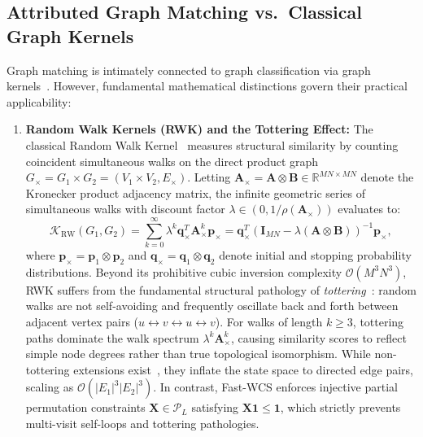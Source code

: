\documentclass[a4paper,fleqn]{cas-dc}
\theoremstyle{thmstyleone}
\theoremstyle{thmstyletwo}
\theoremstyle{thmstylethree}
\begin{document}
\subsection{Attributed Graph Matching vs.\ Classical Graph Kernels}
Graph matching is intimately connected to graph classification via graph kernels~\cite{vishwanathan2010}. However, fundamental mathematical distinctions govern their practical applicability:
\begin{enumerate}
    \item \textbf{Random Walk Kernels (RWK) and the Tottering Effect:} The classical Random Walk Kernel~\cite{vishwanathan2010, kashima2003marginalized} measures structural similarity by counting coincident simultaneous walks on the direct product graph $G_\times = G_1 \times G_2 = (V_1 \times V_2, E_\times)$. Letting $\mathbf{A}_\times = \mathbf{A} \otimes \mathbf{B} \in \mathbb{R}^{MN \times MN}$ denote the Kronecker product adjacency matrix, the infinite geometric series of simultaneous walks with discount factor $\lambda \in (0, 1 / \rho(\mathbf{A}_\times))$ evaluates to:
    \begin{equation}
    \mathcal{K}_{\text{RW}}(G_1, G_2) = \sum_{k=0}^\infty \lambda^k \mathbf{q}_\times^T \mathbf{A}_\times^k \mathbf{p}_\times = \mathbf{q}_\times^T \left( \mathbf{I}_{MN} - \lambda (\mathbf{A} \otimes \mathbf{B}) \right)^{-1} \mathbf{p}_\times,
    \label{eq:rwk_sylvester}
    \end{equation}
    where $\mathbf{p}_\times = \mathbf{p}_1 \otimes \mathbf{p}_2$ and $\mathbf{q}_\times = \mathbf{q}_1 \otimes \mathbf{q}_2$ denote initial and stopping probability distributions. Beyond its prohibitive cubic inversion complexity $\mathcal{O}(M^3 N^3)$, RWK suffers from the fundamental structural pathology of \emph{tottering}~\cite{mahe2005graph}: random walks are not self-avoiding and frequently oscillate back and forth between adjacent vertex pairs ($u \leftrightarrow v \leftrightarrow u \leftrightarrow v$). For walks of length $k \ge 3$, tottering paths dominate the walk spectrum $\lambda^k \mathbf{A}_\times^k$, causing similarity scores to reflect simple node degrees rather than true topological isomorphism. While non-tottering extensions exist~\cite{mahe2005graph}, they inflate the state space to directed edge pairs, scaling as $\mathcal{O}(|E_1|^3 |E_2|^3)$. In contrast, Fast-WCS enforces injective partial permutation constraints $\mathbf{X} \in \mathcal{P}_L$ satisfying $\mathbf{X}\mathbf{1} \le \mathbf{1}$, which strictly prevents multi-visit self-loops and tottering pathologies.
    

\end{enumerate}
\end{document}
